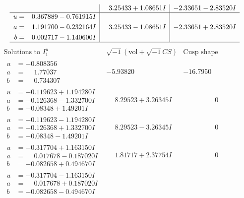\documentclass[1p]{elsarticle_modified}
\theoremstyle{definition}
\newcommand{\I}{\sqrt{-1}}
\begin{document}
$$\begin{array}{c|c|c}
 & \phantom{-}3.25433 + 1.08651 I & -2.33651 - 2.83520 I \\ \hline\begin{aligned}
u &= \phantom{-}0.367889 - 0.761915 I \\
a &= \phantom{-}1.191700 - 0.232164 I \\
b &= \phantom{-}0.002717 - 1.140600 I\end{aligned}
 & \phantom{-}3.25433 - 1.08651 I & -2.33651 + 2.83520 I\\
 \hline 
 \end{array}$$\newpage$$\begin{array}{c|c|c}  
\text{Solutions to }I^u_{1}& \I (\text{vol} + \sqrt{-1}CS) & \text{Cusp shape}\\
 \hline 
\begin{aligned}
u &= -0.808356\phantom{ +0.000000I} \\
a &= \phantom{-}1.77037\phantom{ +0.000000I} \\
b &= \phantom{-}0.734307\phantom{ +0.000000I}\end{aligned}
 & -5.93820\phantom{ +0.000000I} & -16.7950\phantom{ +0.000000I} \\ \hline\begin{aligned}
u &= -0.119623 + 1.194280 I \\
a &= -0.126368 - 1.332700 I \\
b &= -0.08348 + 1.49201 I\end{aligned}
 & \phantom{-}8.29523 + 3.26345 I & \phantom{-0.000000 } 0 \\ \hline\begin{aligned}
u &= -0.119623 - 1.194280 I \\
a &= -0.126368 + 1.332700 I \\
b &= -0.08348 - 1.49201 I\end{aligned}
 & \phantom{-}8.29523 - 3.26345 I & \phantom{-0.000000 } 0 \\ \hline\begin{aligned}
u &= -0.317704 + 1.163150 I \\
a &= \phantom{-}0.017678 - 0.187020 I \\
b &= -0.082658 + 0.494670 I\end{aligned}
 & \phantom{-}1.81717 + 2.37754 I & \phantom{-0.000000 } 0 \\ \hline\begin{aligned}
u &= -0.317704 - 1.163150 I \\
a &= \phantom{-}0.017678 + 0.187020 I \\
b &= -0.082658 - 0.494670 I\end{aligned}

\end{array}$$
\end{document}

